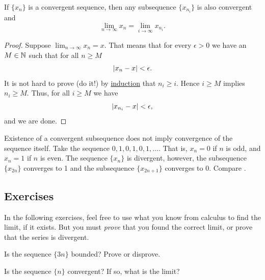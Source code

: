 \begin{prop} \label{prop:seqtosubseq}
If $\{ x_n \}$ is a convergent sequence,
then any subsequence $\{ x_{n_i} \}$ is also convergent and
\begin{equation*}
\lim_{n\to \infty} x_n = 
\lim_{i\to \infty} x_{n_i} .
\end{equation*}
\end{prop}

\begin{proof}
Suppose $\lim_{n\to \infty} x_n = x$.  That means that for every
$\epsilon > 0$ we have an $M \in {\mathbb{N}}$ such that for all $n \geq M$
\begin{equation*}
\left\lvert {x_n - x} \right\rvert < \epsilon .
\end{equation*}
It is not hard to prove (do it!) by \hyperref[induction:thm]{induction} that
$n_i \geq i$.  Hence $i \geq M$ implies $n_i \geq M$.  Thus,
for all $i \geq M$ we have
\begin{equation*}
\left\lvert {x_{n_i} - x} \right\rvert < \epsilon ,
\end{equation*}
and we are done.
\end{proof}

\begin{example}
Existence of a convergent subsequence does not imply
convergence of the sequence itself.
Take the sequence $0,1,0,1,0,1,\ldots$.  That is,
$x_n = 0$ if $n$ is odd, and $x_n = 1$ if $n$ is even.  The sequence
$\{ x_n \}$ is divergent, however, the subsequence
$\{ x_{2n} \}$ converges to 1 and the subsequence
$\{ x_{2n+1} \}$ converges to 0.  Compare .
\end{example}

\subsection{Exercises}

\begin{exnote}
In the following exercises, feel free to use what you know from calculus to
find the limit, if it exists.  But you must \emph{prove}
that you
found the correct limit, or prove that the series is divergent.
\end{exnote}

\begin{exercise}
Is the sequence
$\{ 3n \}$
bounded?  Prove or disprove.
\end{exercise}

\begin{exercise}
Is the sequence
$\{ n \}$
convergent?  If so, what is the limit?
\end{exercise}

